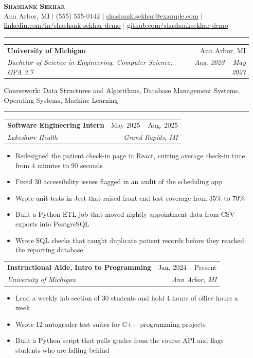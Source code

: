 \documentclass[letterpaper,11pt]{article}
\makeatletter
\renewcommand{\section}[1]{\vspace{5pt}{\large\scshape #1}\par\vspace{-3pt}\rule{\textwidth}{0.4pt}\par\vspace{2pt}}
\newcommand{\resumeItem}[1]{\item\small{#1}}
\newcommand{\resumeSubheading}[4]{
  \item
    \begin{tabular*}{0.97\textwidth}[t]{l@{\extracolsep{\fill}}r}
      \textbf{#1} & #2 \\
      \textit{\small#3} & \textit{\small #4} \\
    \end{tabular*}
}
\newcommand{\resumeSubHeadingListStart}{\begin{list}{}{\setlength{\leftmargin}{0.15in}\setlength{\itemsep}{1pt}\setlength{\topsep}{0pt}}}
\newcommand{\resumeSubHeadingListEnd}{\end{list}}
\newcommand{\resumeItemListStart}{\begin{itemize}\setlength{\itemsep}{-2pt}}
\newcommand{\resumeItemListEnd}{\end{itemize}}
\makeatother
\begin{document}
\begin{center}
    \textbf{\Huge \scshape Shashank Sekhar} \\ \vspace{2pt}
    \small Ann Arbor, MI $|$ (555) 555-0142 $|$ \href{mailto:shashank.sekhar@example.com}{\underline{shashank.sekhar@example.com}} $|$
    \href{https://linkedin.com/in/shashank-sekhar-demo}{\underline{linkedin.com/in/shashank-sekhar-demo}} $|$
    \href{https://github.com/shashanksekhar-demo}{\underline{github.com/shashanksekhar-demo}}
\end{center}
\section{Education}
  \resumeSubHeadingListStart
    \resumeSubheading
      {University of Michigan}{Ann Arbor, MI}
      {Bachelor of Science in Engineering, Computer Science; GPA 3.7}{Aug. 2023 -- May 2027}
    \item \small{Coursework: Data Structures and Algorithms, Database Management Systems, Operating Systems, Machine Learning}
  \resumeSubHeadingListEnd
\section{Experience}
  \resumeSubHeadingListStart
    \resumeSubheading
      {Software Engineering Intern}{May 2025 -- Aug. 2025}
      {Lakeshore Health}{Grand Rapids, MI}
      \resumeItemListStart
        \resumeItem{Redesigned the patient check-in page in React, cutting average check-in time from 4 minutes to 90 seconds}
        \resumeItem{Fixed 30 accessibility issues flagged in an audit of the scheduling app}
        \resumeItem{Wrote unit tests in Jest that raised front-end test coverage from 35\% to 70\%}
        \resumeItem{Built a Python ETL job that moved nightly appointment data from CSV exports into PostgreSQL}
        \resumeItem{Wrote SQL checks that caught duplicate patient records before they reached the reporting database}
      \resumeItemListEnd
    \resumeSubheading
      {Instructional Aide, Intro to Programming}{Jan. 2024 -- Present}
      {University of Michigan}{Ann Arbor, MI}
      \resumeItemListStart
        \resumeItem{Lead a weekly lab section of 30 students and hold 4 hours of office hours a week}
        \resumeItem{Wrote 12 autograder test suites for C++ programming projects}
        \resumeItem{Built a Python script that pulls grades from the course API and flags students who are falling behind}
      \resumeItemListEnd
  \resumeSubHeadingListEnd
\end{document}
